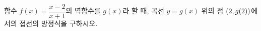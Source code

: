 함수 $f(x)=\dfrac{x-2}{x+1}$의 역함수를 $g(x)$라 할 때, 곡선 $y=g(x)$ 위의 점 $(2{,}\mkern3mu\mathopen{}g(2))$에서의 접선의 방정식을 구하시오.

